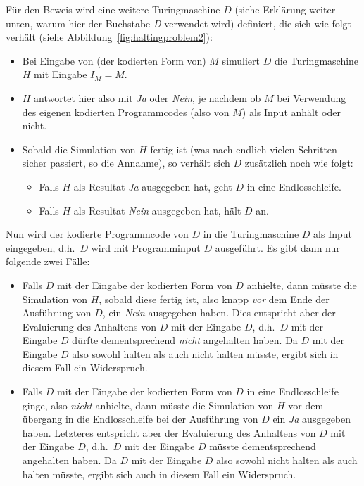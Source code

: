 Für den Beweis wird eine weitere Turingmaschine $D$ (siehe Erklärung weiter unten, warum hier der Buchstabe \emph{D} verwendet wird) definiert, die sich wie folgt verhält (siehe Abbildung~\ref{fig:haltingproblem2}):
\begin{itemize}
  \item Bei Eingabe von (der kodierten Form von) $M$ simuliert $D$  die Turingmaschine $H$ mit Eingabe $I_M = M$.
  \item $H$ antwortet hier also mit \emph{Ja} oder \emph{Nein}, je nachdem ob $M$ bei Verwendung des eigenen kodierten Programmcodes (also von $M$) als Input anhält oder nicht.
  \item Sobald die Simulation von $H$ fertig ist (was nach endlich vielen Schritten sicher passiert, so die Annahme), so verhält sich $D$ zusätzlich noch wie folgt:
    \begin{itemize}
      \item Falls $H$ als Resultat \emph{Ja} ausgegeben hat, geht $D$ in eine Endlosschleife.
      \item Falls $H$ als Resultat \emph{Nein} ausgegeben hat, hält $D$  an.
    \end{itemize}
\end{itemize}

\noindent Nun wird der kodierte Programmcode von $D$ in die Turingmaschine $D$ als Input eingegeben, d.h.\ $D$ wird mit Programminput $D$ ausgeführt. Es gibt dann nur folgende zwei Fälle:

\begin{itemize}
  \item Falls $D$ mit der Eingabe der kodierten Form von $D$ anhielte, dann müsste die Simulation von $H$, sobald diese fertig ist, also knapp \emph{vor} dem Ende der Ausführung von $D$, ein \emph{Nein} ausgegeben haben. Dies entspricht aber der Evaluierung des Anhaltens von $D$ mit der Eingabe $D$, d.h.\ $D$ mit der Eingabe $D$ dürfte dementsprechend \emph{nicht} angehalten haben. Da $D$ mit der Eingabe $D$ also sowohl halten als auch nicht halten müsste, ergibt sich in diesem Fall ein Widerspruch.
  \item Falls $D$ mit der Eingabe der kodierten Form von $D$ in eine Endlosschleife ginge, also \emph{nicht} anhielte, dann müsste die Simulation von $H$ vor dem übergang in die Endlos\-schleife bei der Ausführung von $D$ ein \emph{Ja} ausgegeben haben. Letzteres entspricht aber der Evaluierung des Anhaltens von $D$ mit der Eingabe $D$, d.h.\ $D$ mit der Eingabe $D$ müsste dementsprechend angehalten haben. Da $D$ mit der Eingabe $D$ also sowohl nicht halten als auch halten müsste, ergibt sich auch in diesem Fall ein Widerspruch.
\end{itemize}

